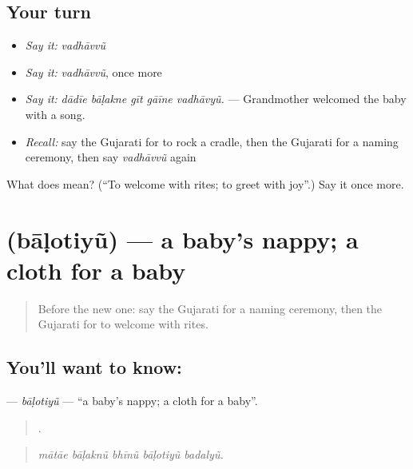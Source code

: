 \subsection*{Your turn}
\begin{itemize}
\raggedright
  \item \emph{Say it:} \emph{vadhāvvũ}
  \item \emph{Say it:} \emph{vadhāvvũ}, once more
  \item \emph{Say it:} \emph{dādīe bāḷakne gīt gāīne vadhāvyũ.} — Grandmother welcomed the baby with a song.
  \item \emph{Recall:} say the Gujarati for to rock a cradle, then the Gujarati for a naming ceremony, then say \emph{vadhāvvũ} again
\end{itemize}

\begin{tcolorbox}[breakable,colback=teal!4,colframe=teal!35!black,title={Before you move on}]
What does  mean? (\textquotedblleft{}To welcome with rites; to greet with joy\textquotedblright{}.) Say it once more.
\end{tcolorbox}
\section[\texorpdfstring{\gu{બાળોતિયું} (bāḷotiyũ)}{બાળોતિયું (bāḷotiyũ)}]{ (bāḷotiyũ) — a baby's nappy; a cloth for a baby}

\label{lesson:GU-C496-balotiyu}



\begin{quote}
Before the new one: say the Gujarati for a naming ceremony, then the Gujarati for to welcome with rites.
\end{quote}

\subsection*{You'll want to know: }
\textbf{} — \emph{bāḷotiyũ} — \textquotedblleft{}a baby's nappy; a cloth for a baby\textquotedblright{}.

\begin{quote}
    .
\end{quote}

\begin{quote}
\emph{mātāe bāḷaknũ bhīnũ bāḷotiyũ badalyũ.}
\end{quote}

